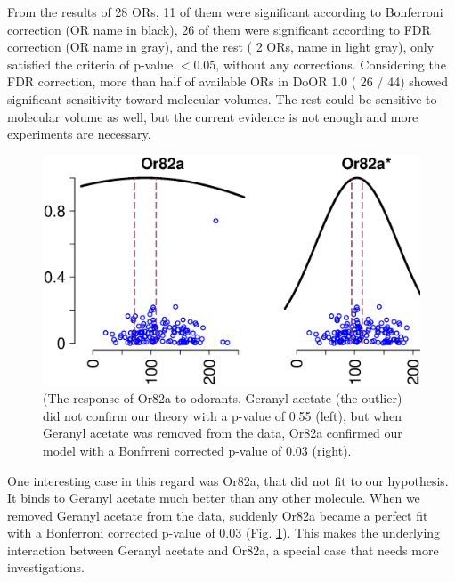 \documentclass[11pt]{paper} %
\newcommand{\numberofreceptors}{ 28 }
\newcommand{\bonferroni}{ 11 }
\newcommand{\fdr}{ 26 }
\newcommand{\nocorrection}{ 2 }
\begin{document}
From the results of \numberofreceptors ORs, 
\bonferroni of them were significant according to Bonferroni correction (OR name in black), 
\fdr of them were significant according to FDR correction (OR name in gray), 
and the rest (\nocorrection ORs, name in light gray), 
only satisfied the criteria of p-value $<0.05$, without any corrections.
Considering the FDR correction, 
more than half of available ORs in DoOR 1.0 (\fdr / 44) showed significant sensitivity toward molecular volumes. 
The rest could be sensitive to molecular volume as well, 
but the current evidence is not enough and more experiments are necessary. 

\begin{figure}
	\centering
	\includegraphics[width= 0.75 \textwidth]{vol-res-Or82a.eps}
	\caption{(The response of Or82a to odorants.  Geranyl acetate (the outlier) did not confirm our theory with a p-value of 0.55 (left), 
	but when Geranyl acetate was removed from the data, 
	Or82a confirmed our model with a Bonfrreni corrected p-value of 0.03 (right).}
	\label{fig:Or82a}
\end{figure}
One interesting case in this regard was Or82a, that did not fit to our hypothesis. 
It binds to Geranyl acetate much better than any other molecule. 
When we removed Geranyl acetate from the data, suddenly Or82a became a perfect fit with a Bonferroni corrected p-value of 0.03 (Fig. \ref{fig:Or82a}). 
This makes the underlying interaction between Geranyl acetate and Or82a, a special case that needs more investigations.
\end{document}
